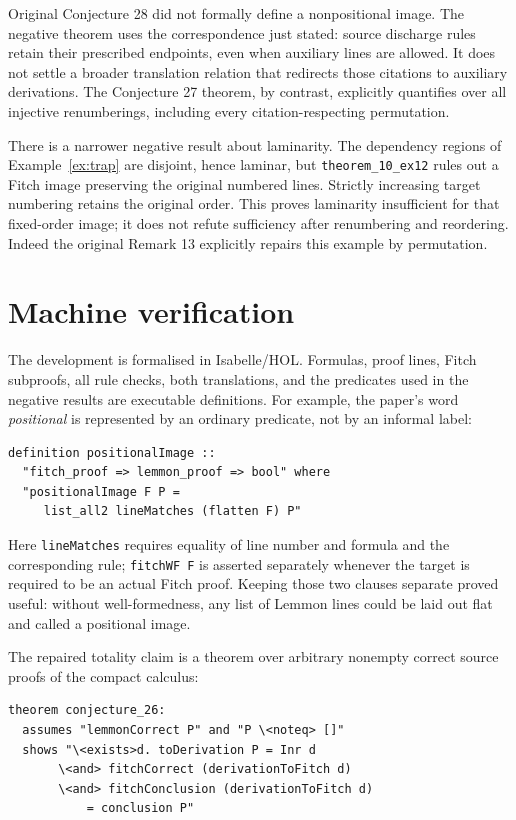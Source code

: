\documentclass[11pt]{article}
\theoremstyle{plain}
\theoremstyle{definition}
\theoremstyle{remark}
\begin{document}
Original Conjecture 28 did not formally define a nonpositional image. The
negative theorem uses the correspondence just stated: source discharge rules
retain their prescribed endpoints, even when auxiliary lines are allowed.
It does not settle a broader translation relation that redirects those
citations to auxiliary derivations. The Conjecture 27 theorem, by contrast,
explicitly quantifies over all injective renumberings, including every
citation-respecting permutation.

There is a narrower negative result about laminarity. The dependency regions
of Example~\ref{ex:trap} are disjoint, hence laminar, but
\verb|theorem_10_ex12| rules out a Fitch image preserving the original
numbered lines. Strictly increasing target numbering retains the original
order. This proves laminarity insufficient for that fixed-order image; it
does not refute sufficiency after renumbering and reordering. Indeed the
original Remark 13 explicitly repairs this example by permutation.

\section{Machine verification}\label{sec:machine}

The development is formalised in Isabelle/HOL. Formulas, proof lines, Fitch
subproofs, all rule checks, both translations, and the predicates used in the
negative results are executable definitions. For example, the paper's word
\emph{positional} is represented by an ordinary predicate, not by an informal
label:

\begin{lstlisting}[language={}]
definition positionalImage ::
  "fitch_proof => lemmon_proof => bool" where
  "positionalImage F P =
     list_all2 lineMatches (flatten F) P"
\end{lstlisting}

\noindent Here \verb|lineMatches| requires equality of line number and formula
and the corresponding rule; \verb|fitchWF F| is asserted separately whenever
the target is required to be an actual Fitch proof. Keeping those two clauses
separate proved useful: without well-formedness, any list of Lemmon lines could
be laid out flat and called a positional image.

The repaired totality claim is a theorem over arbitrary nonempty correct
source proofs of the compact calculus:

\begin{lstlisting}[language={}]
theorem conjecture_26:
  assumes "lemmonCorrect P" and "P \<noteq> []"
  shows "\<exists>d. toDerivation P = Inr d
       \<and> fitchCorrect (derivationToFitch d)
       \<and> fitchConclusion (derivationToFitch d)
           = conclusion P"
\end{lstlisting}
\end{document}
